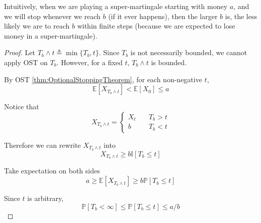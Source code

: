     Intuitively, when we are playing a super-martingale starting with money $a$, and we will stop whenever we reach $b$ (if it ever happens), then the larger $b$ is, the less likely we are to reach $b$ within finite steps (because we are expected to lose money in a super-martingale).

    \begin{proof}
        Let $T_b \wedge t \triangleq \min\{T_b, t\}$. Since $T_b$ is not necessarily bounded, we cannot apply OST on $T_b$. However, for a fixed $t$, $T_b \wedge t$ is bounded.

        By OST \ref{thm:OptionalStoppingTheorem}, for each non-negative $t$,
        \[ \mathbb{E}[X_{T_b \wedge t}] < \mathbb{E}[X_0] \le a \]

        Notice that
        \[ X_{T_b \wedge t} = \begin{cases}
            X_t &\quad T_b > t\\
            b &\quad T_b < t
        \end{cases} \]

        Therefore we can rewrite $X_{T_b \wedge t}$ into
        \[ X_{T_b \wedge t} \ge b\mathbb{I}[T_b \le t] \]

        Take expectation on both sides
        \[ a \ge \mathbb{E}[X_{T_b \wedge t}] \ge b\mathbb{P}[T_b \le t] \]

        Since $t$ is arbitrary,
        \[ \mathbb{P}[T_b < \infty] \le \mathbb{P}[T_b \le t] \le a/b \]
    \end{proof}

